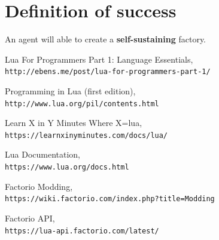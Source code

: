 \documentclass{article}
\begin{document}
\section{Definition of success}
An agent will able to create a \textbf{self-sustaining} factory. 

\begin{thebibliography}{9}

Lua For Programmers Part 1: Language Essentials,
\\\texttt{http://ebens.me/post/lua-for-programmers-part-1/}

Programming in Lua (first edition),
\\\texttt{http://www.lua.org/pil/contents.html}

Learn X in Y Minutes Where X=lua,
\\\texttt{https://learnxinyminutes.com/docs/lua/}

Lua Documentation,
\\\texttt{https://www.lua.org/docs.html}

Factorio Modding,
\\\texttt{https://wiki.factorio.com/index.php?title=Modding}

Factorio API,
\\\texttt{https://lua-api.factorio.com/latest/}

\end{thebibliography}
\end{document}
